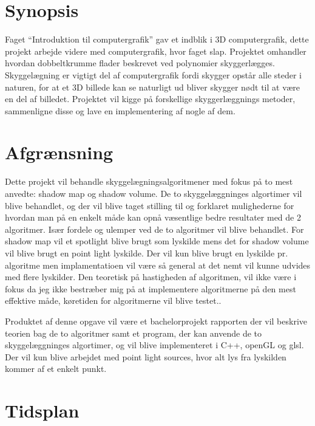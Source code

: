 \documentclass[11pt,a4paper]{article}
\begin{document}
\section{Synopsis}
Faget “Introduktion til computergrafik” gav et indblik i 3D computergrafik, dette projekt arbejde videre med computergrafik, hvor faget slap. Projektet omhandler hvordan dobbeltkrumme flader beskrevet ved polynomier skyggerlægges. Skyggelægning er vigtigt del af computergrafik fordi skygger opstår alle steder i naturen, for at et 3D billede kan se naturligt ud bliver skygger nødt til at være en del af billedet. Projektet vil kigge på forskellige skyggerlæggnings metoder, sammenligne disse og lave en implementering af nogle af dem.

\section{Afgrænsning}
Dette projekt vil behandle skyggelægningsalgoritmener med fokus på to mest anvedte: shadow map og shadow volume. De to skyggelæggninges algortimer vil blive behandlet, og der vil blive taget stilling til og forklaret mulighederne for hvordan man på en enkelt måde kan opnå væsentlige bedre resultater med de 2 algoritmer. Især fordele og ulemper ved de to algoritmer vil blive behandlet. For shadow map vil et spotlight blive brugt som lyskilde mens det for shadow volume vil blive brugt en point light lyskilde. Der vil kun blive brugt en lyskilde pr. algoritme men implamentatioen vil være så general at det nemt vil kunne udvides med flere lyskilder. Den teoretisk på hastigheden af algoritmen,  vil ikke være i fokus da jeg ikke bestræber mig på at implementere algoritmerne på den mest effektive måde, køretiden for algoritmerne vil blive testet..

Produktet af denne opgave vil være et bachelorprojekt rapporten der vil beskrive teorien bag de to algoritmer samt et program, der kan anvende de to skyggelæggninges algortimer, og vil blive implementeret i C++, openGL og glsl. Der vil kun blive arbejdet med point light sources, hvor alt lys fra lyskilden kommer af et enkelt punkt.
\section{Tidsplan}
\end{document}
